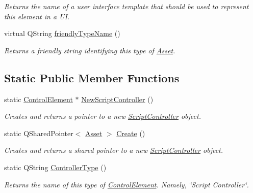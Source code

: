 \begin{DoxyCompactItemize}
\begin{DoxyCompactList}\small\item\em Returns the name of a user interface template that should be used to represent this element in a U\-I. \end{DoxyCompactList}\item 
virtual Q\-String \hyperlink{class_picto_1_1_script_controller_a2620db63182fd3554e7dc61d8d0e6408}{friendly\-Type\-Name} ()
\begin{DoxyCompactList}\small\item\em Returns a friendly string identifying this type of \hyperlink{class_picto_1_1_asset}{Asset}. \end{DoxyCompactList}\end{DoxyCompactItemize}
\subsection*{Static Public Member Functions}
\begin{DoxyCompactItemize}
\item 
\hypertarget{class_picto_1_1_script_controller_a414dce33b6f23110fa4ddc6513bea76f}{static \hyperlink{class_picto_1_1_control_element}{Control\-Element} $\ast$ \hyperlink{class_picto_1_1_script_controller_a414dce33b6f23110fa4ddc6513bea76f}{New\-Script\-Controller} ()}\label{class_picto_1_1_script_controller_a414dce33b6f23110fa4ddc6513bea76f}

\begin{DoxyCompactList}\small\item\em Creates and returns a pointer to a new \hyperlink{class_picto_1_1_script_controller}{Script\-Controller} object. \end{DoxyCompactList}\item 
\hypertarget{class_picto_1_1_script_controller_a3ec58a0badc64a11946f48f0a0f681c7}{static Q\-Shared\-Pointer$<$ \hyperlink{class_picto_1_1_asset}{Asset} $>$ \hyperlink{class_picto_1_1_script_controller_a3ec58a0badc64a11946f48f0a0f681c7}{Create} ()}\label{class_picto_1_1_script_controller_a3ec58a0badc64a11946f48f0a0f681c7}

\begin{DoxyCompactList}\small\item\em Creates and returns a shared pointer to a new \hyperlink{class_picto_1_1_script_controller}{Script\-Controller} object. \end{DoxyCompactList}\item 
\hypertarget{class_picto_1_1_script_controller_acf70b851a58d594b800789f2ac1baa2a}{static Q\-String \hyperlink{class_picto_1_1_script_controller_acf70b851a58d594b800789f2ac1baa2a}{Controller\-Type} ()}\label{class_picto_1_1_script_controller_acf70b851a58d594b800789f2ac1baa2a}

\begin{DoxyCompactList}\small\item\em Returns the name of this type of \hyperlink{class_picto_1_1_control_element}{Control\-Element}. Namely, \char`\"{}\-Script Controller\char`\"{}. \end{DoxyCompactList}\end{DoxyCompactItemize}
